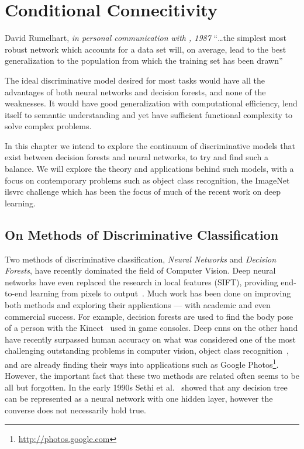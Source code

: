 \documentclass[thesis]{subfiles}
\begin{document}
	\chapter{Conditional Connecitivity}\label{conditionalnetworks}
	\begin{chapquote}{David Rumelhart, \textit{in personal communication with \citet{hanson1989comparing}, 1987}}
		``\ldots the simplest most robust network which accounts for a data set will, on average, lead to the best generalization to the population from which the training set has been drawn''
	\end{chapquote}
	
	The ideal discriminative model desired for most tasks would have all the advantages of both neural networks and decision forests, and none of the weaknesses. It would have good generalization with computational efficiency, lend itself to semantic understanding and yet have sufficient functional complexity to solve complex problems. 
	
	In this chapter we intend to explore the continuum of discriminative models that exist between decision forests and neural networks, to try and find such a balance. We will explore the theory and applications behind such models, with a focus on contemporary problems such as object class recognition, \ie the ImageNet \gls{ilsvrc} challenge which has been the focus of much of the recent work on deep learning.
	
	\section{On Methods of Discriminative Classification}
	
	Two methods of discriminative classification, \emph{Neural Networks} and \emph{Decision Forests}, have recently dominated the field of Computer Vision. Deep neural networks have even replaced the research in local features (\eg SIFT), providing end-to-end learning from pixels to output~\citep{yi2016lift}. Much work has been done on improving both methods and exploring their applications --- with academic and even commercial success. For example, decision forests are used to find the body pose of a person with the Kinect~\citep{conf/cvpr/ShottonFCSFMKB11} used in game consoles. Deep \glspl{cnn} on the other hand have recently surpassed human accuracy on what was considered one of the most challenging outstanding problems in computer vision, object class recognition~\citep{He2015b}, and are already finding their ways into applications such as Google Photos\footnote{\href{http://photos.google.com}{http://photos.google.com}}. However, the important fact that these two methods are related often seems to be all but forgotten. In the early 1990s Sethi et al.~\citep{Sethi1990} showed that any decision tree can be represented as a neural network with one hidden layer, however the converse does not necessarily hold true.
	
\end{document}
